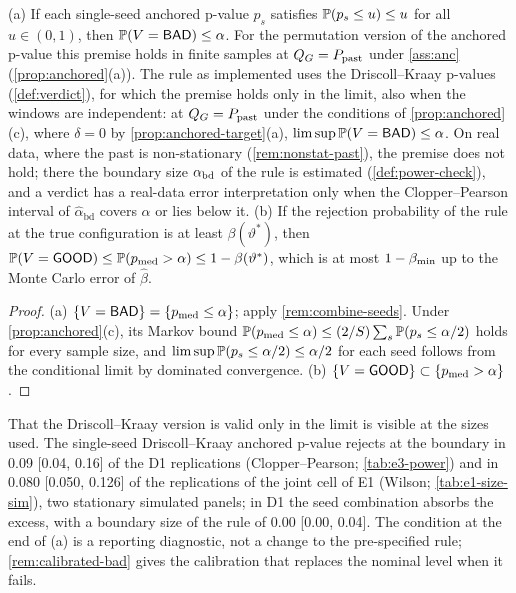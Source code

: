 \begin{proposition}\label{prop:verdict}
(a) If each single-seed anchored p-value $p_s$ satisfies $\mathbb{P}(p_s\le u)\le u$ for all
$u\in(0,1)$, then $\mathbb{P}(V=\textsf{BAD})\le\alpha$. For the permutation version of the anchored p-value
this premise holds in finite samples at $Q_{G}=P_{\mathrm{past}}$ under \cref{ass:anc} (\cref{prop:anchored}(a)).
The rule as implemented uses the Driscoll--Kraay p-values (\cref{def:verdict}), for which the
premise holds only in the limit, also when the windows are independent: at $Q_{G}=P_{\mathrm{past}}$ under the
conditions of \cref{prop:anchored}(c), where $\delta=0$ by \cref{prop:anchored-target}(a),
$\limsup\mathbb{P}(V=\textsf{BAD})\le\alpha$. On real data, where the past is non-stationary
(\cref{rem:nonstat-past}), the premise does not hold; there the boundary size $\alpha_{\mathrm{bd}}$ of the rule
is estimated (\cref{def:power-check}), and a \BAD{} verdict has a real-data error interpretation
only when the Clopper--Pearson interval of $\hat\alpha_{\mathrm{bd}}$ covers $\alpha$ or lies below
it.
(b) If the rejection probability of the rule at the true configuration is at least
$\beta(\vartheta^*)$, then $\mathbb{P}(V=\textsf{GOOD})\le\mathbb{P}(p_{\mathrm{med}}>\alpha)\le1-\beta(\vartheta^*)$, which is
at most $1-\beta_{\min}$ up to the Monte Carlo error of $\hat\beta$.
\end{proposition}
\begin{proof}
(a) $\{V=\textsf{BAD}\}=\{p_{\mathrm{med}}\le\alpha\}$; apply \cref{rem:combine-seeds}. Under
\cref{prop:anchored}(c), its Markov bound $\mathbb{P}(p_{\mathrm{med}}\le\alpha)\le(2/S)\sum_s\mathbb{P}(p_s\le\alpha/2)$
holds for every sample size, and $\limsup\mathbb{P}(p_s\le\alpha/2)\le\alpha/2$ for each seed follows
from the conditional limit by dominated convergence.
(b) $\{V=\textsf{GOOD}\}\subset\{p_{\mathrm{med}}>\alpha\}$.
\end{proof}

That the Driscoll--Kraay version is valid only in the limit is visible at the sizes used. The
single-seed Driscoll--Kraay anchored p-value rejects at the boundary in 0.09 [0.04, 0.16] of the D1
replications (Clopper--Pearson; \cref{tab:e3-power}) and in 0.080 [0.050, 0.126] of the
replications of the joint cell of E1 (Wilson; \cref{tab:e1-size-sim}), two stationary simulated
panels; in D1 the seed combination absorbs the excess, with a boundary size of the rule of 0.00
[0.00, 0.04]. The \BAD{} condition at the end of (a) is a reporting diagnostic, not a change to the
pre-specified rule; \cref{rem:calibrated-bad} gives the calibration that replaces the nominal level
when it fails.

